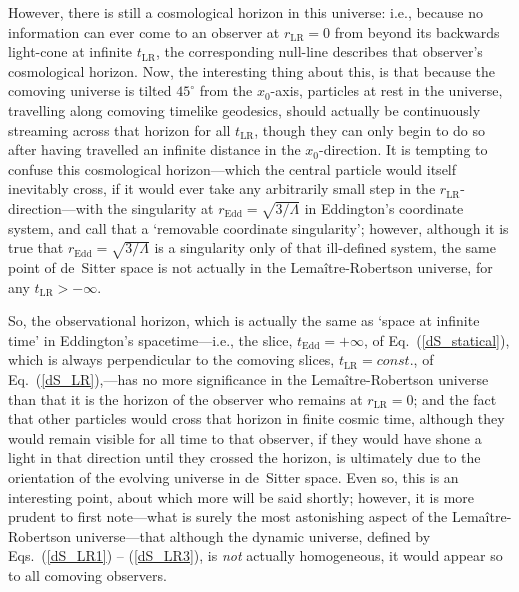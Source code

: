 However, there is still a cosmological horizon in this universe: i.e., because no information can ever come to an observer at $r_{\mathrm{LR}}=0$ from beyond its backwards light-cone at infinite $t_{\mathrm{LR}}$, the corresponding null-line describes that observer's cosmological horizon. Now, the interesting thing about this, is that because the comoving universe is tilted $45^{\circ}$ from the $x_0$-axis, particles at rest in the universe, travelling along comoving timelike geodesics, should actually be continuously streaming across that horizon for all $t_{\mathrm{LR}}$, though they can only begin to do so after having travelled an infinite distance in the $x_0$-direction. It is tempting to confuse this cosmological horizon---which the central particle would itself inevitably cross, if it would ever take any arbitrarily small step in the $r_{\mathrm{LR}}$-direction---with the singularity at $r_{\mathrm{Edd}}=\sqrt{3/\Lambda}$ in Eddington's coordinate system, and call that a `removable coordinate singularity'; however, although it is true that $r_{\mathrm{Edd}}=\sqrt{3/\Lambda}$ is a singularity only of that ill-defined system, the same point of de~Sitter space is not actually in the Lema\^{i}tre-Robertson universe, for any $t_{\mathrm{LR}}>-\infty$. 

So, the observational horizon, which is actually the same as `space at infinite time' in Eddington's spacetime---i.e., the slice, $t_{\mathrm{Edd}}=+\infty$, of Eq.~(\ref{dS_statical}), which is always perpendicular to the comoving slices, $t_{\mathrm{LR}}=const.$, of Eq.~(\ref{dS_LR}),---has no more significance in the Lema\^{i}tre-Robertson universe than that it is the horizon of the observer who remains at $r_{\mathrm{LR}}=0$; and the fact that other particles would cross that horizon in finite cosmic time, although they would remain visible for all time to that observer, if they would have shone a light in that direction until they crossed the horizon, is ultimately due to the orientation of the evolving universe in de~Sitter space. Even so, this is an interesting point, about which more will be said shortly; however, it is more prudent to first note---what is surely the most astonishing aspect of the Lema\^{i}tre-Robertson universe---that although the dynamic universe, defined by Eqs.~(\ref{dS_LR1}) -- (\ref{dS_LR3}), is \textit{not} actually homogeneous, it would appear so to all comoving observers.

